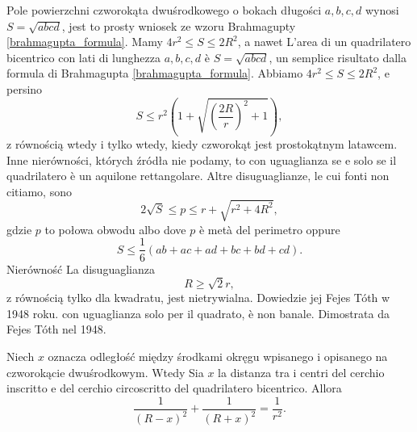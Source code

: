 Pole powierzchni czworokąta dwuśrodkowego o bokach długości $a, b, c, d$ wynosi $S = \sqrt{abcd}$, jest to prosty wniosek ze wzoru Brahmagupty \ref{brahmagupta_formula}. %
Mamy $4r^2 \le S \le 2R^2$, a nawet %
L'area di un quadrilatero bicentrico con lati di lunghezza $a, b, c, d$ è $S = \sqrt{abcd}$, un semplice risultato dalla formula di Brahmagupta \ref{brahmagupta_formula}. %
Abbiamo $4r^2 \le S \le 2R^2$, e persino %
\begin{equation}
    S \le r^2 \left(1 + \sqrt{\left(\frac{2R}{r}\right)^2 + 1} \right),
\end{equation}
z równością wtedy i tylko wtedy, kiedy czworokąt jest prostokątnym latawcem. %
Inne nierówności, których źródła nie podamy, to %
con uguaglianza se e solo se il quadrilatero è un aquilone rettangolare. %
Altre disuguaglianze, le cui fonti non citiamo, sono %
\begin{equation}
    2 \sqrt {S} \le p \le r + \sqrt{r^2 + 4R^2},
\end{equation}
gdzie $p$ to połowa obwodu albo %
dove $p$ è metà del perimetro oppure %
\begin{equation}
    S \le \frac 1 6 \left(ab + ac + ad + bc + bd + cd\right).
\end{equation}
Nierówność %
La disuguaglianza %
\begin{equation}
    R \ge \sqrt 2 r,
\end{equation}
z równością tylko dla kwadratu, jest nietrywialna. Dowiedzie jej Fejes Tóth w 1948 roku. %
con uguaglianza solo per il quadrato, è non banale. Dimostrata da Fejes Tóth nel 1948. %
%

\begin{theorem}
[Fussa, 1792] %
[Fuss, 1792] %
Niech $x$ oznacza odległość między środkami okręgu wpisanego i opisanego na czworokącie dwuśrodkowym. %
Wtedy %
Sia $x$ la distanza tra i centri del cerchio inscritto e del cerchio circoscritto del quadrilatero bicentrico. %
Allora %
\begin{equation}
    \frac{1}{(R-x)^2} + \frac{1}{(R+x)^2} = \frac{1}{r^2}.
\end{equation}
\end{theorem}

